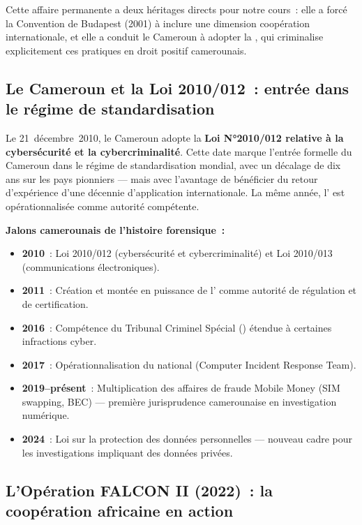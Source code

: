 \medskip

Cette affaire permanente a deux héritages directs pour notre cours~: elle a
forcé la Convention de Budapest (2001) à inclure une dimension coopération
internationale, et elle a conduit le Cameroun à adopter la
, qui criminalise explicitement ces pratiques en droit
positif camerounais.

\subsection{Le Cameroun et la Loi 2010/012~: entrée dans le régime de standardisation}

Le 21~décembre~2010, le Cameroun adopte la \textbf{Loi N°2010/012 relative
à la cybersécurité et la cybercriminalité}. Cette date marque l'entrée
formelle du Cameroun dans le régime de standardisation mondial, avec un
décalage de dix ans sur les pays pionniers --- mais avec l'avantage de
bénéficier du retour d'expérience d'une décennie d'application internationale.
La même année, l' est opérationnalisée comme autorité compétente.

\begin{boxjuris}
\textbf{Jalons camerounais de l'histoire forensique~:}
\begin{itemize}
    \item \textbf{2010}~: Loi 2010/012 (cybersécurité et cybercriminalité)
          et Loi 2010/013 (communications électroniques).
    \item \textbf{2011}~: Création et montée en puissance de l'
          comme autorité de régulation et de certification.
    \item \textbf{2016}~: Compétence du Tribunal Criminel Spécial ()
          étendue à certaines infractions cyber.
    \item \textbf{2017}~: Opérationnalisation du  national
          (Computer Incident Response Team).
    \item \textbf{2019--présent}~: Multiplication des affaires de fraude
          Mobile Money (SIM swapping, BEC) --- première jurisprudence
          camerounaise en investigation numérique.
    \item \textbf{2024}~: Loi sur la protection des données personnelles ---
          nouveau cadre pour les investigations impliquant des données privées.
\end{itemize}
\end{boxjuris}

\subsection{L'Opération FALCON II (2022)~: la coopération africaine en action}

